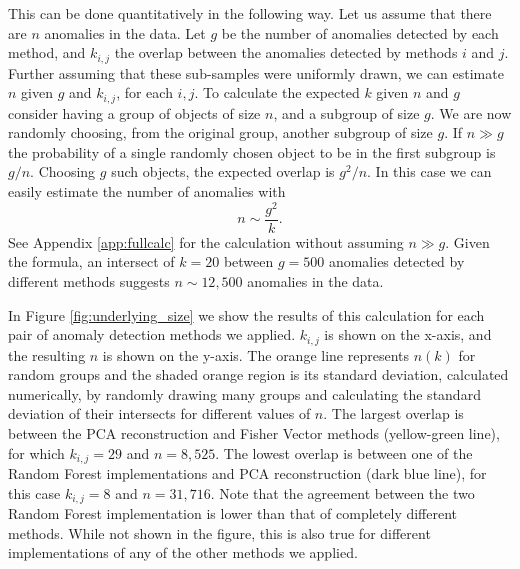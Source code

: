 \documentclass[fleqn,usenatbib]{mnras}
\begin{document}
{This can be done quantitatively in the following way. Let us assume that there are $n$ anomalies in the data. Let $g$ be the number of anomalies detected by each method, and $k_{i,j}$ the overlap between the anomalies detected by methods $i$ and $j$. Further assuming that these sub-samples were uniformly drawn, we can  estimate  $n$ given $g$ and $k_{i,j}$, for each $i,j$.  To calculate the expected  $k$ given $n$ and $g$ consider having a group of objects of size $n$, and a subgroup of size $g$.  We are now randomly choosing, from the original group, another subgroup of size $g$. If $n \gg g$ the probability of a single randomly chosen object to be in the first subgroup is $g/n$. Choosing $g$ such objects,  the expected  overlap is $g^2/n$. In this case we can easily estimate the number of anomalies  with
\begin{equation}
    n \sim \frac{g^2}{k}.
\end{equation}
See Appendix \ref{app:fullcalc} for the calculation without assuming $n \gg g$. Given the formula, an intersect of $k= 20$ between $g=500$ anomalies detected by different methods suggests $n \sim 12,500$ anomalies in the data. 







In Figure \ref{fig:underlying_size} we show the results of this calculation for each pair of anomaly detection methods we applied.  $k_{i,j}$  is shown on the x-axis, and the resulting $n$ is shown on the y-axis. The orange line represents  $n(k)$ for random groups and the shaded orange region is its standard deviation, calculated  numerically, by randomly drawing many groups and calculating the standard deviation of their intersects for different values of $n$. The largest overlap is between the PCA reconstruction and Fisher Vector methods (yellow-green line), for which $k_{i,j} = 29$ and $n = 8,525$. The lowest overlap is between one of the Random Forest implementations and PCA reconstruction (dark blue line), for this case $k_{i,j} = 8$ and $n = 31,716$. Note that the agreement between the two Random Forest implementation is  lower than that of completely different methods. While not shown in the figure, this is also true for different implementations of any of the other methods we applied. 

}
\end{document}
